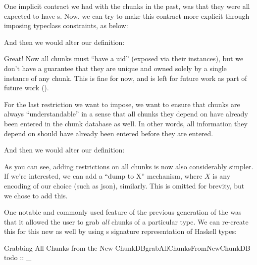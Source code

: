 One implicit contract we had with the chunks in the past, was that they were all
expected to have \UID{}s. Now, we can try to make this contract more explicit
through imposing typeclass constraints, as below:

\uidOwnershipContract{}

And then we would alter our \Chunk{} definition:

\chunksWithUidConstraint{}

Great! Now all chunks must ``have a \acs{uid}'' (exposed via their \HasUID{}
instances), but we don't have a guarantee that they are unique and owned solely
by a single instance of any chunk. This is fine for now, and is left for future
work as part of future work ().

For the last restriction we want to impose, we want to ensure that chunks are
always ``understandable'' in a sense that all chunks they depend on have already
been entered in the chunk database as well. In other words, all information they
depend on should have already been entered before they are entered.

\chunkDependenciesContract{}

And then we would alter our \Chunk{} definition:

\chunksWithUidAndRefListConstraint{}

As you can see, adding restrictions on all chunks is now also considerably
simpler. If we're interested, we can add a ``dump to X'' mechanism, where $X$ is
any encoding of our choice (such as \acs{json}), similarly. This is omitted for
brevity, but we chose to add this.


One notable and commonly used feature of the previous generation of the
\ChunkDB{} was that it allowed the user to grab \textit{all} chunks of a
particular type. We can re-create this for this new \ChunkDB{} as well by using
s \TypeRep{} signature representation of Haskell types:

\begin{pseudohaskell}{Grabbing All Chunks from the New ChunkDB}{grabAllChunksFromNewChunkDB}
todo :: _
\end{pseudohaskell}



